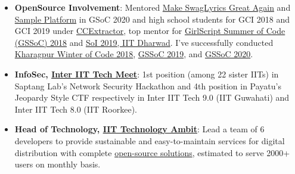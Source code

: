 \documentclass[a4paper,10pt]{extarticle} %
\begin{document}
\begin{itemize}[leftmargin=0.55cm, rightmargin=0.2cm, label={\Large\textbullet}]

\item \textbf{OpenSource Involvement}: Mentored \href{https://summerofcode.withgoogle.com/projects/#6058060717490176}{Make SwagLyrics Great Again} and \href{https://summerofcode.withgoogle.com/projects/#6707916582682624}{Sample Platform} in GSoC 2020 and  high school students for GCI 2018 and GCI 2019 under \href{https://codein.withgoogle.com/organizations/ccextractor-development/}{CCExtractor}, top mentor for \href{https://www.gssoc.tech/}{GirlScript Summer of Code (GSSoC) 2018} and \href{https://oss2019.github.io/SoI.html}{SoI 2019, IIT Dharwad}. I've successfully conducted
\href{https://kwoc.kossiitkgp.org/}{Kharagpur Winter of Code 2018}, \href{https://gssoc.tech/}{GSSoC 2019}, and \href{https://gssoc.tech/}{GSSoC 2020}.

\item\textbf{InfoSec, \href{https://wiki.metakgp.org/w/Inter_IIT_Tech_Meet}{Inter IIT Tech Meet}}: 1st position (among 22 sister IITs) in Saptang Lab's Network Security Hackathon and 4th position in Payatu's Jeopardy Style CTF respectively in Inter IIT Tech 9.0 (IIT Guwahati) and Inter IIT Tech 8.0 (IIT Roorkee).

\item\textbf{Head of Technology, {\href{https://iit-techambit.in}{IIT Technology Ambit}}}: Lead a team of 6 developers to provide sustainable and easy-to-maintain services for digital distribution with complete {\href{https://github.com/iit-technology-ambit/}{open-source solutions}}, estimated to serve 2000+ users on monthly basis.




\end{itemize}
\end{document}
